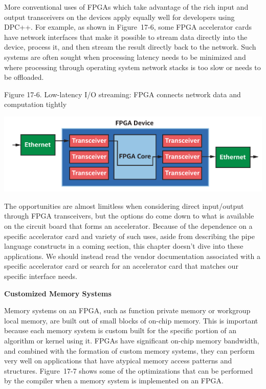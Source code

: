 More conventional uses of FPGAs which take advantage of the rich input and output transceivers on the devices apply equally well for developers using DPC++. For example, as shown in Figure 17-6, some FPGA accelerator cards have network interfaces that make it possible to stream data directly into the device, process it, and then stream the result directly back to the network. Such systems are often sought when processing latency needs to be minimized and where processing through operating system network stacks is too slow or needs to be offloaded.\par

\hspace*{\fill} \par %
Figure 17-6. Low-latency I/O streaming: FPGA connects network data and computation tightly
\begin{center}
	\includegraphics[width=1.0\textwidth]{content/chapter-17/images/7}
\end{center}

The opportunities are almost limitless when considering direct input/output through FPGA transceivers, but the options do come down to what is available on the circuit board that forms an accelerator. Because of the dependence on a specific accelerator card and variety of such uses, aside from describing the pipe language constructs in a coming section, this chapter doesn’t dive into these applications. We should instead read the vendor documentation associated with a specific accelerator card or search for an accelerator card that matches our specific interface needs.\par

\hspace*{\fill} \par %
\textbf{Customized Memory Systems}

Memory systems on an FPGA, such as function private memory or workgroup local memory, are built out of small blocks of on-chip memory. This is important because each memory system is custom built for the specific portion of an algorithm or kernel using it. FPGAs have significant on-chip memory bandwidth, and combined with the formation of custom memory systems, they can perform very well on applications that have atypical memory access patterns and structures. Figure 17-7 shows some of the optimizations that can be performed by the compiler when a memory system is implemented on an FPGA.\par

